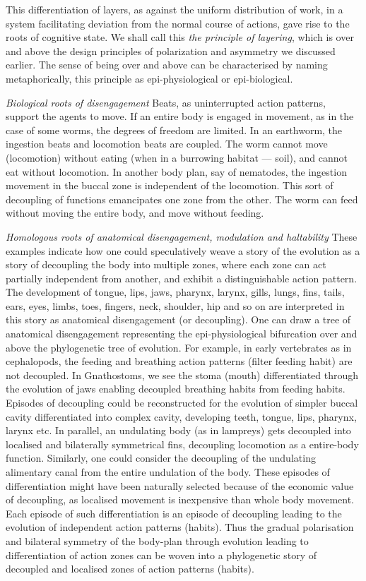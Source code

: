 This differentiation of layers, as against the uniform distribution of work, in a system facilitating deviation from the normal course of actions, gave rise to the roots of cognitive state. We shall call this \textit{the principle of layering}, which is over and above the design principles of polarization and asymmetry we discussed earlier. The sense of being over and above can be characterised by naming metaphorically, this principle as epi-physiological or epi-biological.

\emph{Biological roots of disengagement} Beats, as uninterrupted action patterns, support the agents to move. If an entire body is engaged in movement, as in the case of some worms, the degrees of freedom are limited. In an earthworm, the ingestion beats and locomotion beats are coupled. The worm cannot move (locomotion) without eating (when in a burrowing habitat --- soil), and cannot eat without locomotion. In another body plan, say of nematodes, the ingestion movement in the buccal zone is independent of the locomotion. This sort of decoupling of functions emancipates one zone from the other. The worm can feed without moving the entire body, and move without feeding.

\emph{Homologous roots of anatomical disengagement, modulation and haltability} These examples indicate how one could speculatively weave a story of the evolution as a story of decoupling the body into multiple zones, where each zone can act partially independent from another, and exhibit a distinguishable action pattern. The development of tongue, lips, jaws, pharynx, larynx, gills, lungs, fins, tails, ears, eyes, limbs, toes, fingers, neck, shoulder, hip and so on are interpreted in this story as anatomical disengagement (or decoupling). One can draw a tree of anatomical disengagement representing the epi-physiological bifurcation over and above the phylogenetic tree of evolution. For example, in early vertebrates as in cephalopods, the feeding and breathing action patterns (filter feeding habit) are not decoupled. In Gnathostoms, we see the stoma (mouth) differentiated through the evolution of jaws enabling decoupled breathing habits from feeding habits. Episodes of decoupling could be reconstructed for the evolution of simpler buccal cavity differentiated into complex cavity, developing teeth, tongue, lips, pharynx, larynx etc. In parallel, an undulating body (as in lampreys) gets decoupled into localised and bilaterally symmetrical fins, decoupling locomotion as a entire-body function. Similarly, one could consider the decoupling of the undulating alimentary canal from the entire undulation of the body. These episodes of differentiation might have been naturally selected because of the economic value of decoupling, as localised movement is inexpensive than whole body movement. Each episode of such differentiation is an episode of decoupling leading to the evolution of independent action patterns (habits). Thus the gradual polarisation and bilateral symmetry of the body-plan through evolution leading to differentiation of action zones can be woven into a phylogenetic story of decoupled and localised zones of action patterns (habits).

